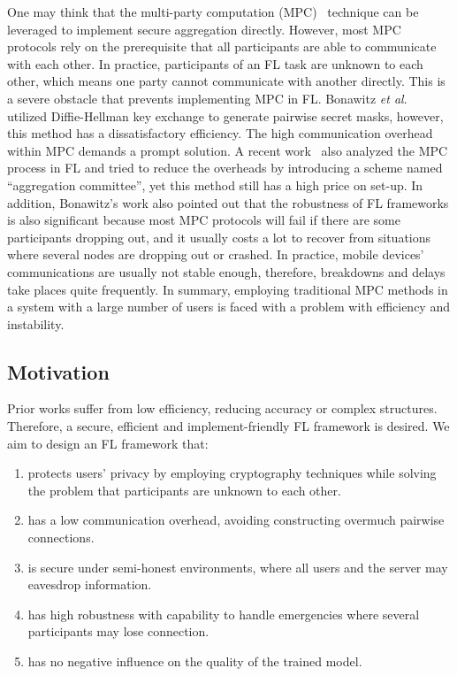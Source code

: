 One may think that the multi-party computation (MPC)~\cite{Yao} technique can be leveraged to implement secure aggregation directly. However, most MPC protocols rely on the prerequisite that all participants are able to communicate with each other. In practice, participants of an FL task are unknown to each other, which means one party cannot communicate with another directly. This is a severe obstacle that prevents implementing MPC in FL. Bonawitz \emph{et al}.~\cite{Practical} utilized Diffie-Hellman key exchange to generate pairwise secret masks, however, this method has a dissatisfactory efficiency. The high communication overhead within MPC demands a prompt solution. A recent work~\cite{Two-Phase} also analyzed the MPC process in FL and tried to reduce the overheads by introducing a scheme named ``aggregation committee'', yet this method still has a high price on set-up. In addition, Bonawitz's work also pointed out that the robustness of FL frameworks is also significant because most MPC protocols will fail if there are some participants dropping out, and it usually costs a lot to recover from situations where several nodes are dropping out or crashed. In practice, mobile devices' communications are usually not stable enough, therefore, breakdowns and delays take places quite frequently. In summary, employing traditional MPC methods in a system with a large number of users is faced with a problem with efficiency and instability.

\subsection{Motivation} 
Prior works suffer from low efficiency, reducing accuracy or complex structures. Therefore, a secure, efficient and implement-friendly FL framework is desired. We aim to design an FL framework that:
\begin{enumerate}
    \item protects users' privacy by employing cryptography techniques while solving the problem that participants are unknown to each other.

    \item has a low communication overhead, avoiding constructing overmuch pairwise connections.

    \item is secure under semi-honest environments, where all users and the server may eavesdrop information.

    \item has high robustness with capability to handle emergencies where several participants may lose connection.

    \item has no negative influence on the quality of the trained model.
\end{enumerate}


